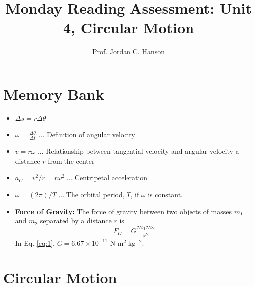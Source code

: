 \documentclass{article}
\begin{document}
\twocolumn

\title{Monday Reading Assessment: Unit 4, Circular Motion}
\author{Prof. Jordan C. Hanson}

\maketitle

\section{Memory Bank}

\begin{itemize}
\item $\Delta s = r \Delta \theta$
\item $\omega = \frac{\Delta \theta}{\Delta t}$ ... Definition of angular velocity
\item $v = r\omega $ ... Relationship between tangential velocity and angular velocity a distance $r$ from the center
\item $a_C = v^2/r = r \omega^2$ ... Centripetal acceleration\
\item $\omega = (2\pi)/T$ ... The orbital period, $T$, if $\omega$ is constant.
\item \textbf{Force of Gravity:} The force of gravity between two objects of masses $m_1$ and $m_2$ separated by a distance $r$ is
\begin{equation}
F_G = G \frac{m_1 m_2}{r^2} \label{eq:1}
\end{equation}
In Eq. \ref{eq:1}, $G = 6.67 \times 10^{-11}$ N m$^{2}$ kg$^{-2}$.
\end{itemize}

\section{Circular Motion}
\end{document}
